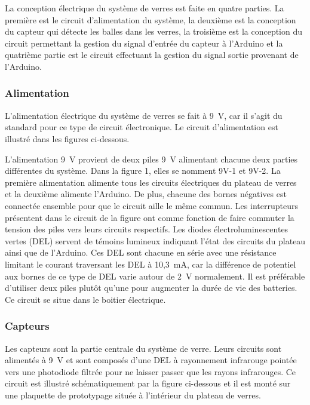 La conception électrique du système de verres est faite en quatre parties.
La première est le circuit d’alimentation du système, la deuxième est la conception du capteur qui détecte les balles dans les verres, la troisième est la conception du circuit permettant la gestion du signal d’entrée du capteur à l'Arduino et la quatrième partie est le circuit effectuant la gestion du signal sortie provenant de l’Arduino.

\subsubsection{Alimentation}

L’alimentation électrique du système de verres se fait à 9~V, car il s’agit du standard pour ce type de circuit électronique.
Le circuit d’alimentation est illustré dans les figures ci-dessous.


L’alimentation 9~V provient de deux piles 9~V alimentant chacune deux parties différentes du système.
Dans la figure 1, elles se nomment 9V-1 et 9V-2.
La première alimentation alimente tous les circuits électriques du plateau de verres et la deuxième alimente l’Arduino.
De plus, chacune des bornes négatives est connectée ensemble pour que le circuit aille le même commun.
Les interrupteurs présentent dans le circuit de la figure ont comme fonction de faire commuter la tension des piles vers leurs circuits respectifs.
Les diodes électroluminescentes vertes (DEL) servent de témoins lumineux indiquant l’état des circuits du plateau ainsi que de l’Arduino.
Ces DEL sont chacune en série avec une résistance limitant le courant traversant les DEL à 10,3~mA, car la différence de potentiel aux bornes de ce type de DEL varie autour de 2~V normalement.
Il est préférable d’utiliser deux piles plutôt qu’une pour augmenter la durée de vie des batteries.
Ce circuit se situe dans le boitier électrique.

\subsubsection{Capteurs}

Les capteurs sont la partie centrale du système de verre.
Leurs circuits sont alimentés à 9~V et sont composés d’une DEL à rayonnement infrarouge pointée vers une photodiode filtrée pour ne laisser passer que les rayons infrarouges.
Ce circuit est illustré schématiquement par la figure ci-dessous  et il est monté sur une plaquette de prototypage située à l’intérieur du plateau de verres.

